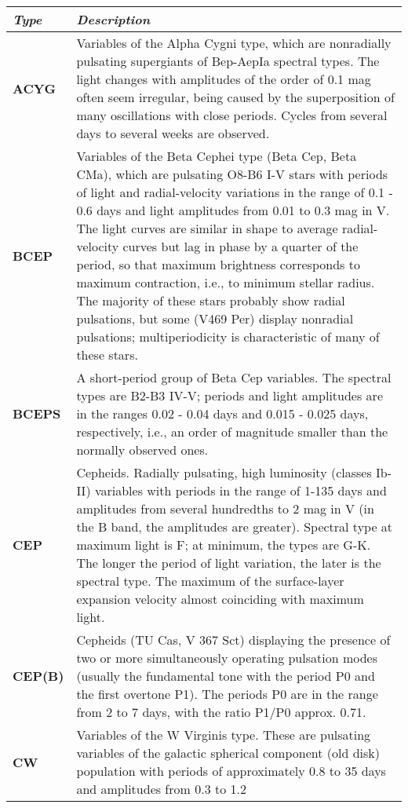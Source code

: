 \begin{longtabu} to \textwidth {l|X}
\toprule
\emph{Type} & \emph{Description}\\
\midrule
\textbf{ACYG} & Variables of the Alpha Cygni type, which are nonradially
pulsating supergiants of Bep-AepIa spectral types. The light changes
with amplitudes of the order of 0.1 mag often seem irregular, being
caused by the superposition of many oscillations with close periods.
Cycles from several days to several weeks are observed.\\
\midrule
\textbf{BCEP} & Variables of the Beta Cephei type (Beta Cep, Beta CMa),
which are pulsating O8-B6 I-V stars with periods of light and
radial-velocity variations in the range of 0.1 - 0.6 days and light
amplitudes from 0.01 to 0.3 mag in V. The light curves are similar in
shape to average radial-velocity curves but lag in phase by a quarter of
the period, so that maximum brightness corresponds to maximum
contraction, i.e., to minimum stellar radius. The majority of these
stars probably show radial pulsations, but some (V469 Per) display
nonradial pulsations; multiperiodicity is characteristic of many of
these stars.\\
\midrule
\textbf{BCEPS} & A short-period group of Beta Cep variables. The
spectral types are B2-B3 IV-V; periods and light amplitudes are in the
ranges 0.02 - 0.04 days and 0.015 - 0.025 days, respectively, i.e., an
order of magnitude smaller than the normally observed
ones.\\
\midrule
\textbf{CEP} & Cepheids. Radially pulsating, high luminosity (classes
Ib-II) variables with periods in the range of 1-135 days and amplitudes
from several hundredths to 2 mag in V (in the B band, the amplitudes are
greater). Spectral type at maximum light is F; at minimum, the types are
G-K. The longer the period of light variation, the later is the spectral
type. The maximum of the surface-layer expansion velocity almost
coinciding with maximum light.\\
\midrule
\textbf{CEP(B)} & Cepheids (TU Cas, V 367 Sct) displaying the presence
of two or more simultaneously operating pulsation modes (usually the
fundamental tone with the period P0 and the first overtone P1). The
periods P0 are in the range from 2 to 7 days, with the ratio P1/P0
approx. 0.71.\\
\midrule
\textbf{CW} & Variables of the W Virginis type. These are pulsating
variables of the galactic spherical component (old disk) population with
periods of approximately 0.8 to 35 days and amplitudes from 0.3 to 1.2

\end{longtabu}
